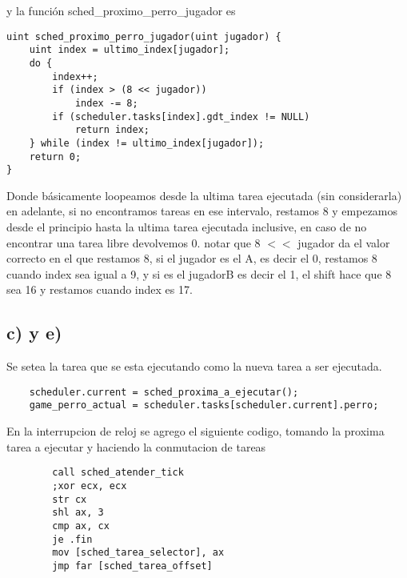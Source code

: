 y la función sched\_proximo\_perro\_jugador es 

\begin{codesnippet}
\begin{verbatim}
uint sched_proximo_perro_jugador(uint jugador) {
    uint index = ultimo_index[jugador];
    do {
        index++;
        if (index > (8 << jugador))
            index -= 8;
        if (scheduler.tasks[index].gdt_index != NULL)
            return index;
    } while (index != ultimo_index[jugador]);
    return 0;
}
\end{verbatim}
\end{codesnippet}

Donde básicamente loopeamos desde la ultima tarea ejecutada (sin considerarla) en adelante, si no encontramos tareas en ese intervalo, restamos 8 y empezamos desde el principio hasta la ultima tarea ejecutada inclusive, en caso de no encontrar una tarea 
libre devolvemos 0. notar que 8 $<<$ jugador da el valor correcto en el que restamos 8, si el jugador es el A, es decir el 0, restamos 8 cuando index sea igual a 9, y si es el jugadorB es decir el 1, el shift hace que 8 sea 16 y restamos cuando index es 17. 



\subsection{c) y e)}
 Se setea la tarea que se esta ejecutando como la nueva tarea a ser ejecutada. 
\begin{codesnippet}
\begin{verbatim}
	scheduler.current = sched_proxima_a_ejecutar();
    game_perro_actual = scheduler.tasks[scheduler.current].perro;
    \end{verbatim}
\end{codesnippet}

En la interrupcion de reloj se agrego el siguiente codigo, tomando la proxima tarea a ejecutar y haciendo la conmutacion de tareas
  \begin{codesnippet}
\begin{verbatim}
        call sched_atender_tick
        ;xor ecx, ecx
        str cx
        shl ax, 3
        cmp ax, cx
        je .fin
        mov [sched_tarea_selector], ax
        jmp far [sched_tarea_offset]
            \end{verbatim}
\end{codesnippet}

